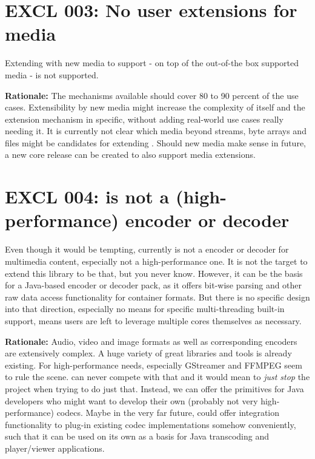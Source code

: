 
\section{EXCL 003: No user extensions for \LibName{} media}
\label{sec:EXCL01220LesenVonXMLMetadaten}

Extending \LibName{} with new media to support - on top of the out-of-the box supported media - is not supported.

\textbf{Rationale:} The mechanisms available should cover 80 to 90 percent of the use cases. Extensibility by new media might increase the complexity of \LibName{} itself and the extension mechanism in specific, without adding real-world use cases really needing it. It is currently not clear which media beyond streams, byte arrays and files might be candidates for extending \LibName{}. Should new media make sense in future, a new core release can be created to also support media extensions.


\section{EXCL 004: \LibName{} is not a (high-performance) encoder or decoder}
\label{sec:EXCL004}

Even though it would be tempting, \LibName{} currently is not a encoder or decoder for multimedia content, especially not a high-performance one. It is not the target to extend this library to be that, but you never know. However, it can be the basis for a Java-based encoder or decoder pack, as it offers bit-wise parsing and other raw data access functionality for container formats. But there is no specific design into that direction, especially no means for specific multi-threading built-in support, means users are left to leverage multiple cores themselves as necessary.

\textbf{Rationale:} Audio, video and image formats as well as corresponding encoders are extensively complex. A huge variety of great libraries and tools is already existing. For high-performance needs, especially GStreamer and FFMPEG seem to rule the scene. \LibName{} can never compete with that and it would mean to \emph{just stop} the project when trying to do just that. Instead, we can offer the primitives for Java developers who might want to develop their own (probably not very high-performance) codecs. Maybe in the very far future, \LibName{} could offer integration functionality to plug-in existing codec implementations somehow conveniently, such that it can be used on its own as a basis for Java transcoding and player/viewer applications.

